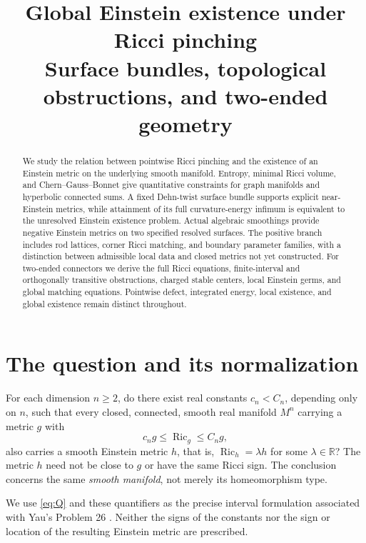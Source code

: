 \documentclass[a4paper,11pt]{article}
\title{Global Einstein existence under Ricci pinching\\[0.5em]{\large Surface bundles, topological obstructions, and two-ended geometry}}
\author{}
\date{}
\numberwithin{equation}{section}
\theoremstyle{definition}
\newcommand{\Ric}{\operatorname{Ric}}
\newcommand{\R}{\mathbb R}
\begin{document}
\maketitle
\begin{abstract}
We study the relation between pointwise Ricci pinching and the existence of an Einstein metric on the underlying smooth manifold. Entropy, minimal Ricci volume, and Chern--Gauss--Bonnet give quantitative constraints for graph manifolds and hyperbolic connected sums. A fixed Dehn-twist surface bundle supports explicit near-Einstein metrics, while attainment of its full curvature-energy infimum is equivalent to the unresolved Einstein existence problem. Actual algebraic smoothings provide negative Einstein metrics on two specified resolved surfaces. The positive branch includes rod lattices, corner Ricci matching, and boundary parameter families, with a distinction between admissible local data and closed metrics not yet constructed. For two-ended connectors we derive the full Ricci equations, finite-interval and orthogonally transitive obstructions, charged stable centers, local Einstein germs, and global matching equations. Pointwise defect, integrated energy, local existence, and global existence remain distinct throughout.
\end{abstract}
\begingroup
\small\linespread{1.0}\selectfont\setlength{\parskip}{0pt}
\tableofcontents
\endgroup
\clearpage

\section{The question and its normalization}
For each dimension $n\ge2$, do there exist real constants $c_n<C_n$, depending only on $n$, such that every closed, connected, smooth real manifold $M^n$ carrying a metric $g$ with
\begin{equation}\label{eq:Q}
 c_ng\le\Ric_g\le C_ng,
\end{equation}
also carries a smooth Einstein metric $h$, that is, $\Ric_h=\lambda h$ for some $\lambda\in\R$? The metric $h$ need not be close to $g$ or have the same Ricci sign. The conclusion concerns the same \emph{smooth manifold}, not merely its homeomorphism type.

We use \eqref{eq:Q} and these quantifiers as the precise interval formulation associated with Yau's Problem 26 \cite{Yau1982}. Neither the signs of the constants nor the sign or location of the resulting Einstein metric are prescribed.
\end{document}
